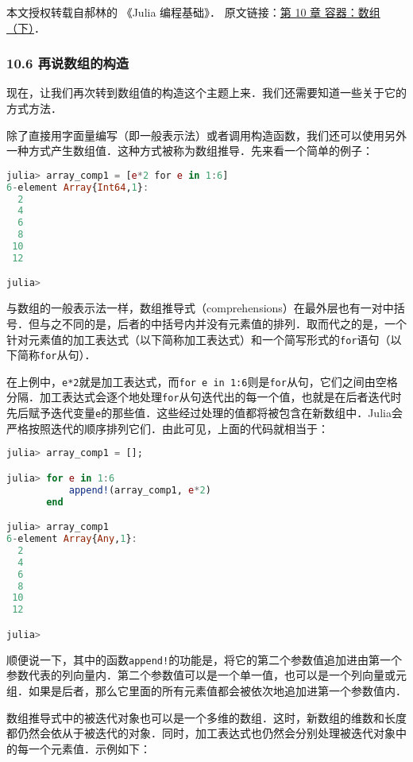 
本文授权转载自郝林的 《Julia 编程基础》． 原文链接：\href{https://github.com/hyper0x/JuliaBasics/blob/master/book/ch10.md}{第 10 章 容器：数组（下）}．

\subsubsection{10.6 再说数组的构造}

现在，让我们再次转到数组值的构造这个主题上来．我们还需要知道一些关于它的方式方法．

除了直接用字面量编写（即一般表示法）或者调用构造函数，我们还可以使用另外一种方式产生数组值．这种方式被称为数组推导．先来看一个简单的例子：

\begin{lstlisting}[language=julia]
julia> array_comp1 = [e*2 for e in 1:6]
6-element Array{Int64,1}:
  2
  4
  6
  8
 10
 12

julia> 
\end{lstlisting}

与数组的一般表示法一样，数组推导式（comprehensions）在最外层也有一对中括号．但与之不同的是，后者的中括号内并没有元素值的排列．取而代之的是，一个针对元素值的加工表达式（以下简称加工表达式）和一个简写形式的\verb|for|语句（以下简称\verb|for|从句）．

在上例中，\verb|e*2|就是加工表达式，而\verb|for e in 1:6|则是\verb|for|从句，它们之间由空格分隔．加工表达式会逐个地处理\verb|for|从句迭代出的每一个值，也就是在后者迭代时先后赋予迭代变量\verb|e|的那些值．这些经过处理的值都将被包含在新数组中．Julia会严格按照迭代的顺序排列它们．由此可见，上面的代码就相当于：

\begin{lstlisting}[language=julia]
julia> array_comp1 = [];

julia> for e in 1:6
           append!(array_comp1, e*2)
       end

julia> array_comp1
6-element Array{Any,1}:
  2
  4
  6
  8
 10
 12

julia>  
\end{lstlisting}

顺便说一下，其中的函数\verb|append!|的功能是，将它的第二个参数值追加进由第一个参数代表的列向量内．第二个参数值可以是一个单一值，也可以是一个列向量或元组．如果是后者，那么它里面的所有元素值都会被依次地追加进第一个参数值内．

数组推导式中的被迭代对象也可以是一个多维的数组．这时，新数组的维数和长度都仍然会依从于被迭代的对象．同时，加工表达式也仍然会分别处理被迭代对象中的每一个元素值．示例如下：

